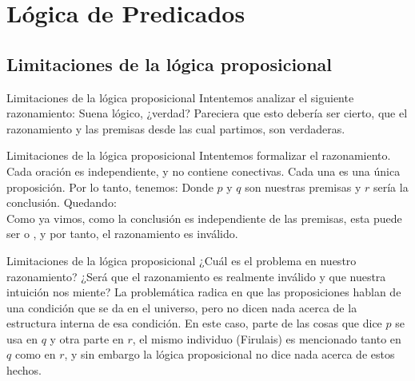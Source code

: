 
\section{Lógica de Predicados}
\subsection{Limitaciones de la lógica proposicional}


\begin{frame}{Limitaciones de la lógica proposicional}
  Intentemos analizar el siguiente razonamiento:
  \jump
  \jump
  Suena lógico, ¿verdad? Pareciera que esto debería ser cierto, que el
  razonamiento y las premisas desde las cual partimos, son verdaderas.
\end{frame}


\begin{frame}{Limitaciones de la lógica proposicional}
  Intentemos formalizar el razonamiento. Cada oración es independiente, y no
  contiene conectivas. Cada una es una única proposición. Por lo tanto, tenemos:
  \jump
  \jump
  Donde $p$ y $q$ son nuestras premisas y $r$ sería la conclusión. Quedando:\\
  \jump
  Como ya vimos, como la conclusión es independiente de las premisas, esta puede
  ser \fulltrue o \fullfalse, y por tanto, el razonamiento es inválido.
\end{frame}


\begin{frame}{Limitaciones de la lógica proposicional}
  ¿Cuál es el problema en nuestro razonamiento? ¿Será que el razonamiento es
  realmente inválido y que nuestra intuición nos miente?
  \jump
  La problemática radica en que las proposiciones hablan de una condición que
  se da en el universo, pero no dicen nada acerca de la estructura interna de
  esa condición.
  \jump
  En este caso, parte de las cosas que dice $p$ se usa en $q$ y otra parte en $r$,
  el mismo individuo (Firulais) es mencionado tanto en $q$ como en $r$, y sin
  embargo la lógica proposicional no dice nada acerca de estos hechos.
\end{frame}


